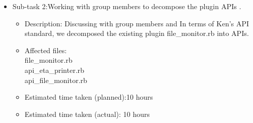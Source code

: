 \begin{itemize}
                    \begin{itemize}
			 \item  Sub-task 2:Working with group members to decompose the plugin APIs .
                         \begin{itemize}
					\item Description: Discussing with group members and In terms of Ken's   API standard, we decomposed the existing plugin 
                                        file\_monitor.rb into APIs.
                                        \item Affected files: \\
                                             file\_monitor.rb\\
                                             api\_eta\_printer.rb\\
                                             api\_file\_monitor.rb\\
					\item Estimated time taken (planned):10 hours
					\item Estimated time taken (actual): 10 hours
		       \end{itemize}              
                       \end{itemize}     
           \end{itemize}

